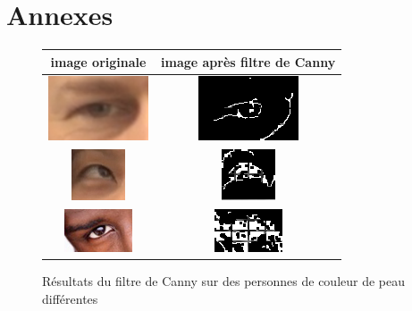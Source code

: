 \section{Annexes}

\renewcommand{\figurename}{Annexe}
\setcounter{figure}{0}  

\label{resultCanny}
\begin{figure}[H]
  \center
 \begin{tabular}{|c|c|}
  \hline
  image originale & image après filtre de Canny\\
  \hline
  \includegraphics{image/original.png} & \includegraphics{image/canny_final.png}\\
  \hline
  \includegraphics{image/original_asiatique.png} & \includegraphics{image/cannyAsiatique.png}\\
  \hline
  \includegraphics{image/original_black.png} & \includegraphics{image/cannyBlack.png}\\
  \hline
 \end{tabular}
  \caption{Résultats du filtre de Canny sur des personnes de couleur de peau différentes}
\end{figure}



\newpage